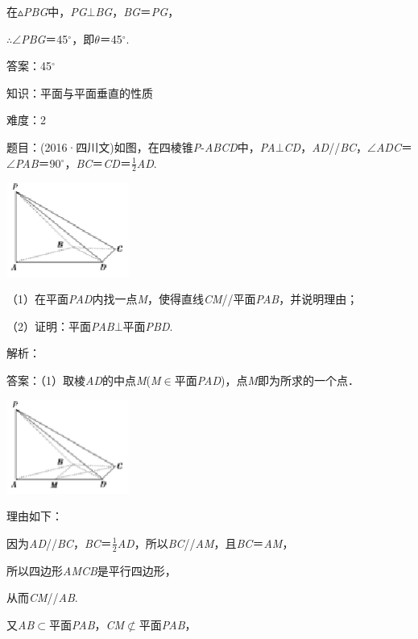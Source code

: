 \documentclass{article} %
\begin{document}
在$\mathrm{\vartriangle}$\textit{PBG}中，\textit{PG}$\mathrm{\bot}$\textit{BG}，\textit{BG}＝\textit{PG}，

$\mathrm{\therefore}$$\mathrm{\angle}$\textit{PBG}＝45$\mathrm{{}^\circ}$，即\textit{$\theta$}＝45$\mathrm{{}^\circ}$.

答案：45$\mathrm{{}^\circ}$

知识：平面与平面垂直的性质

难度：2

题目：(2016·四川文)如图，在四棱锥\textit{P}-\textit{ABCD}中，\textit{PA}$\mathrm{\bot}$\textit{CD}，\textit{AD}//\textit{BC}，$\mathrm{\angle}$\textit{ADC}＝$\mathrm{\angle}$\textit{PAB}＝90$\mathrm{{}^\circ}$，\textit{BC}＝\textit{CD}＝$\frac{1}{2}$\textit{AD}.

\includegraphics*[width=1.59in, height=1.21in, keepaspectratio=false]{image258}

（1）在平面\textit{PAD}内找一点\textit{M}，使得直线\textit{CM}//平面\textit{PAB}，并说明理由；

（2）证明：平面\textit{PAB}$\mathrm{\bot}$平面\textit{PBD}.

解析：

答案：（1）取棱\textit{AD}的中点\textit{M}(\textit{M}$\mathrm{\in}$平面\textit{PAD})，点\textit{M}即为所求的一个点．

\includegraphics*[width=1.59in, height=1.21in, keepaspectratio=false]{image259}

理由如下：

因为\textit{AD}//\textit{BC}，\textit{BC}＝$\frac{1}{2}$\textit{AD}，所以\textit{BC}//\textit{AM}，且\textit{BC}＝\textit{AM}，

所以四边形\textit{AMCB}是平行四边形，

从而\textit{CM}//\textit{AB}.

又\textit{AB}$\mathrm{\subset }$平面\textit{PAB}，\textit{CM}$\mathrm{\nsubset}$平面\textit{PAB}，
\end{document}
